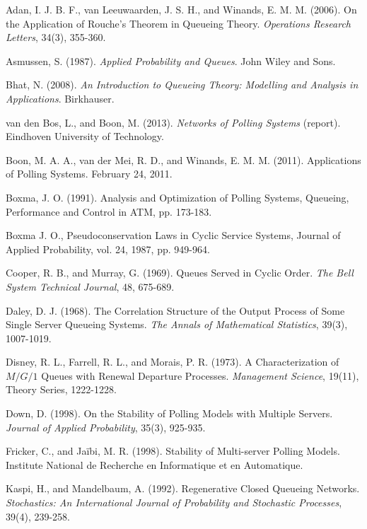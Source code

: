 \documentclass[12pt]{article}
\begin{document}
\begin{thebibliography}{99}

 Adan, I. J. B. F., van Leeuwaarden, J. S. H., and Winands, E. M. M. (2006). On the Application of Rouche’s Theorem in Queueing Theory. \textit{Operations Research Letters}, 34(3), 355-360.

 Asmussen, S. (1987). \textit{Applied Probability and Queues}. John Wiley and Sons.

 Bhat, N. (2008). \textit{An Introduction to Queueing Theory: Modelling and Analysis in Applications}. Birkhauser.

 van den Bos, L., and Boon, M. (2013). \textit{Networks of Polling Systems} (report). Eindhoven University of Technology.

 Boon, M. A. A., van der Mei, R. D., and Winands, E. M. M. (2011). Applications of Polling Systems. February 24, 2011.

 Boxma, J. O. (1991). Analysis and Optimization of Polling Systems, Queueing, Performance and Control in ATM, pp. 173-183.

 Boxma J. O., Pseudoconservation Laws in Cyclic Service Systems, Journal of Applied Probability, vol. 24, 1987, pp. 949-964.

 Cooper, R. B., and Murray, G. (1969). Queues Served in Cyclic Order. \textit{The Bell System Technical Journal}, 48, 675-689.

 Daley, D. J. (1968). The Correlation Structure of the Output Process of Some Single Server Queueing Systems. \textit{The Annals of Mathematical Statistics}, 39(3), 1007-1019.

 Disney, R. L., Farrell, R. L., and Morais, P. R. (1973). A Characterization of $M/G/1$ Queues with Renewal Departure Processes. \textit{Management Science}, 19(11), Theory Series, 1222-1228.

 Down, D. (1998). On the Stability of Polling Models with Multiple Servers. \textit{Journal of Applied Probability}, 35(3), 925-935.

 Fricker, C., and Jaïbi, M. R. (1998). Stability of Multi-server Polling Models. Institute National de Recherche en Informatique et en Automatique.


 Kaspi, H., and Mandelbaum, A. (1992). Regenerative Closed Queueing Networks. \textit{Stochastics: An International Journal of Probability and Stochastic Processes}, 39(4), 239-258.


\end{thebibliography}
\end{document}
